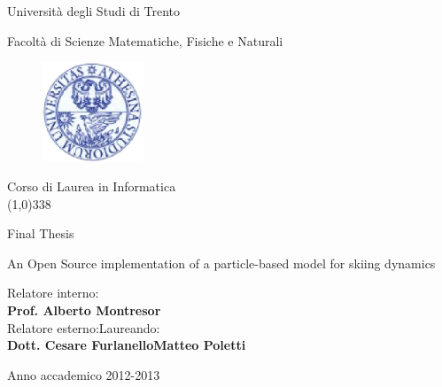 \documentclass[12pt,a4paper,twoside]{book}
\begin{document}
\begin{titlepage}
  \begin{center}
    \begin{Large}Universit\`a degli Studi di Trento\\\end{Large}
     Facolt\`a di Scienze Matematiche, Fisiche e Naturali\\
     \vspace{10pt}
     \begin{figure}[htbp]
       \begin{center}
         \includegraphics[width=3cm]{images/sigillo_unitn.eps}
       \end{center}
     \end{figure}
Corso di Laurea in Informatica\\

\vspace{10pt}
\line(1,0){338}
\vspace{10pt}

Final Thesis\\
\end{center}
\vspace{3cm}
\begin{center}
\begin{Large}An Open Source implementation of a particle-based model for skiing dynamics\\\end{Large}
\vspace{3cm}
\end{center}
Relatore interno: \\ \textbf{Prof. Alberto Montresor} \\
Relatore esterno:\hspace{6.8cm}Laureando:   \\
\textbf{Dott. Cesare Furlanello}\hspace{4.9cm}\textbf{Matteo Poletti}
\vspace{1cm}
\begin{center}
Anno accademico 2012-2013
\end{center}
\end{titlepage}
\end{document}
